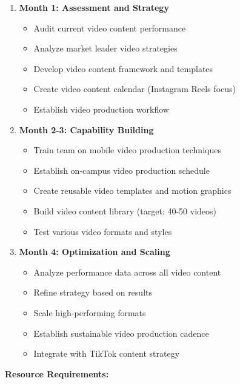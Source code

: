 \documentclass[12pt]{report}
\begin{document}
\begin{enumerate}
\item \textbf{Month 1: Assessment and Strategy}
\begin{itemize}
\item Audit current video content performance
\item Analyze market leader video strategies
\item Develop video content framework and templates
\item Create video content calendar (Instagram Reels focus)
\item Establish video production workflow
\end{itemize}

\item \textbf{Month 2-3: Capability Building}
\begin{itemize}
\item Train team on mobile video production techniques
\item Establish on-campus video production schedule
\item Create reusable video templates and motion graphics
\item Build video content library (target: 40-50 videos)
\item Test various video formats and styles
\end{itemize}

\item \textbf{Month 4: Optimization and Scaling}
\begin{itemize}
\item Analyze performance data across all video content
\item Refine strategy based on results
\item Scale high-performing formats
\item Establish sustainable video production cadence
\item Integrate with TikTok content strategy
\end{itemize}
\end{enumerate}

\textbf{Resource Requirements:}
\end{document}
